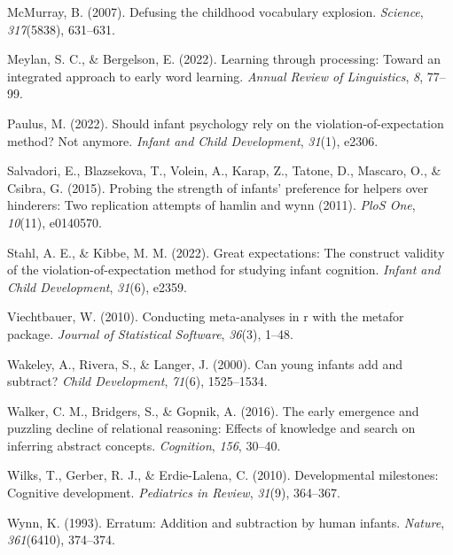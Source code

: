 \documentclass[10pt, letterpaper]{article}
\newenvironment{CSLReferences}%
  {}%
  {\par}
\begin{document}
\begin{CSLReferences}{1}{0}
\leavevmode{}%
McMurray, B. (2007). Defusing the childhood vocabulary explosion.
\emph{Science}, \emph{317}(5838), 631--631.

\leavevmode{}%
Meylan, S. C., \& Bergelson, E. (2022). Learning through processing:
Toward an integrated approach to early word learning. \emph{Annual
Review of Linguistics}, \emph{8}, 77--99.

\leavevmode{}%
Paulus, M. (2022). Should infant psychology rely on the
violation-of-expectation method? Not anymore. \emph{Infant and Child
Development}, \emph{31}(1), e2306.

\leavevmode{}%
Salvadori, E., Blazsekova, T., Volein, A., Karap, Z., Tatone, D.,
Mascaro, O., \& Csibra, G. (2015). Probing the strength of infants'
preference for helpers over hinderers: Two replication attempts of
hamlin and wynn (2011). \emph{PloS One}, \emph{10}(11), e0140570.

\leavevmode{}%
Stahl, A. E., \& Kibbe, M. M. (2022). Great expectations: The construct
validity of the violation-of-expectation method for studying infant
cognition. \emph{Infant and Child Development}, \emph{31}(6), e2359.

\leavevmode{}%
Viechtbauer, W. (2010). Conducting meta-analyses in r with the metafor
package. \emph{Journal of Statistical Software}, \emph{36}(3), 1--48.

\leavevmode{}%
Wakeley, A., Rivera, S., \& Langer, J. (2000). Can young infants add and
subtract? \emph{Child Development}, \emph{71}(6), 1525--1534.

\leavevmode{}%
Walker, C. M., Bridgers, S., \& Gopnik, A. (2016). The early emergence
and puzzling decline of relational reasoning: Effects of knowledge and
search on inferring abstract concepts. \emph{Cognition}, \emph{156},
30--40.

\leavevmode{}%
Wilks, T., Gerber, R. J., \& Erdie-Lalena, C. (2010). Developmental
milestones: Cognitive development. \emph{Pediatrics in Review},
\emph{31}(9), 364--367.

\leavevmode{}%
Wynn, K. (1993). Erratum: Addition and subtraction by human infants.
\emph{Nature}, \emph{361}(6410), 374--374.

\end{CSLReferences}


\end{document}
